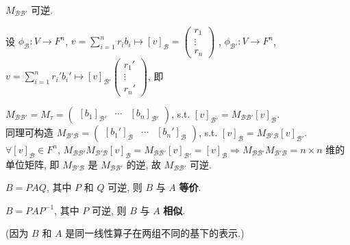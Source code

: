 \documentclass{note}
\begin{document}
$M_{\mathcal{BB}'}$ 可逆.
\begin{pf}
    设 $\phi_{\mathcal{B}}:V\rightarrow F^n$, $v=\sum_{i=1}^nr_ib_i\mapsto[v]_{\mathcal{B}}=\begin{pmatrix}
        r_1\\
        \vdots\\
        r_n
    \end{pmatrix}$ , $\phi_{\mathcal{B}'}:V\rightarrow F^n$, $v=\sum_{i=1}^nr_i'b_i'\mapsto[v]_{\mathcal{B}'}\begin{pmatrix}
        r_1'\\
        \vdots\\
        r_n'
    \end{pmatrix}$, 即
    \begin{center}
    \end{center}
    $M_{\mathcal{BB}'}=M_{\tau}=\begin{pmatrix}
        [b_1]_{\mathcal{B}'}&\cdots&[b_n]_{\mathcal{B}'}
    \end{pmatrix}$, s.t. $[v]_{\mathcal{B}'}=M_{\mathcal{BB}'}[v]_{\mathcal{B}}$.\\
    同理可构造 $M_{\mathcal{B'B}}=\begin{pmatrix}
        [b_1']_{\mathcal{B}}&\cdots&[b_n']_{\mathcal{B}}
    \end{pmatrix}$, s.t. $[v]_{\mathcal{B}}=M_{\mathcal{B'B}}[v]_{\mathcal{B}'}$.\\
    $\forall[v]_{\mathcal{B}}\in F^n$, $M_{\mathcal{BB}'}M_{\mathcal{B'B}}[v]_{\mathcal{B}}=M_{\mathcal{BB}'}[v]_{\mathcal{B}'}=[v]_{\mathcal{B}}\Longrightarrow M_{\mathcal{BB}'}M_{\mathcal{B'B}}=n\times n$ 维的单位矩阵, 即 $M_{\mathcal{B'B}}$ 是 $M_{\mathcal{BB}'}$ 的逆, 故 $M_{\mathcal{BB}'}$ 可逆.
\end{pf}

\begin{thm}[(课本定理 2.18)]
    $B=PAQ$, 其中 $P$ 和 $Q$ 可逆, 则 $B$ 与 $A$ \textbf{等价}.
\end{thm}

\begin{thm}[(课本定理 2.19)]
    $B=PAP^{-1}$, 其中 $P$ 可逆, 则 $B$ 与 $A$ \textbf{相似}.
\end{thm}
(因为 $B$ 和 $A$ 是同一线性算子在两组不同的基下的表示.)
\ifx\allfiles\undefined
\end{document}
